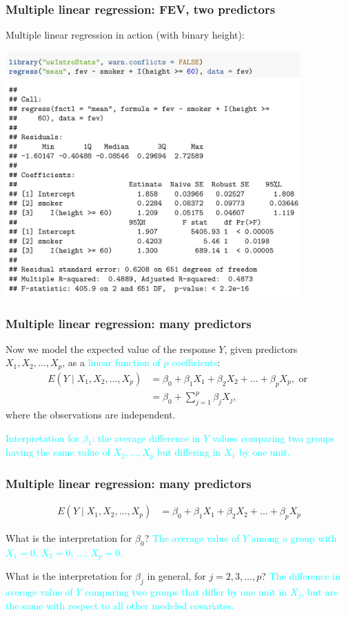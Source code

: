 \documentclass[12pt, 
hyperref={colorlinks=true, linkcolor=blue, urlcolor=cyan}]{beamer}
\begin{document}
\begin{frame}
\frametitle{Multiple linear regression: FEV, two predictors}
Multiple linear regression in action (with binary height): \vspace{-0.45cm}
\begin{center}
\includegraphics[width=0.85\textwidth]{plots/fev_vs_smoke_adjust_binary_height.png}
\end{center}
\end{frame}

\begin{frame}
\frametitle{Multiple linear regression: many predictors}
Now we model the expected value of the response $Y$, given predictors $X_1, X_2, \dots, X_p$, as a \textcolor{cyan}{linear function of $p$ coefficients}:
\begin{align*}
E(Y \mid X_1, X_2, \dots, X_p) &= \beta_0 + \beta_1 X_1 + \beta_2 X_2 + \dots + \beta_p X_p, \text{ or } \\
&= \beta_0 + \sum_{j=1}^p \beta_j X_j,
\end{align*} 
where the observations are independent.

\textcolor{cyan}{Interpretation for $\beta_1$: the average difference in $Y$ values comparing two groups having the same value of $X_2, \dots, X_p$ but differing in $X_1$ by one unit.}

\end{frame}

\begin{frame}
\frametitle{Multiple linear regression: many predictors}
\begin{align*}
E(Y \mid X_1, X_2, \dots, X_p) &= \beta_0 + \beta_1 X_1 + \beta_2 X_2 + \dots + \beta_p X_p
\end{align*}

What is the interpretation for $\beta_0$? \pause \textcolor{cyan}{The average value of $Y$ among a group with $X_1 = 0$, $X_2 = 0$, $\dots$, $X_p = 0$.} \pause

What is the interpretation for $\beta_j$ in general, for $j = 2, 3, \dots, p$? \pause \textcolor{cyan}{The difference in average value of $Y$ comparing two groups that differ by one unit in $X_j$, but are the same with respect to all other modeled covariates.}

\end{frame}
\end{document}
